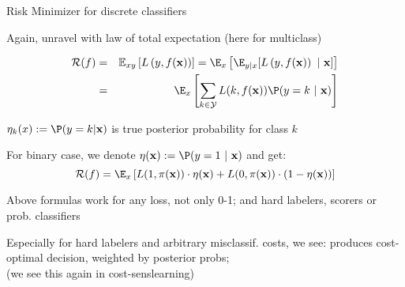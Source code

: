 \documentclass[11pt,compress,t,notes=noshow, xcolor=table]{beamer}
\begin{document}
\begin{framei}[sep=M]{Risk Minimizer for discrete classifiers}

\item Again, unravel with law of total expectation (here for multiclass)

\vspace*{-0.5cm}

\begin{eqnarray*}
  \riskf  & = & \Exy\left[\Lxy\right] = \E_x \left[ \E_{y|x} [ \Lxy ~|~ \xv ] \right] \\
          & = & \E_x \left[\sum_{k \in \Yspace} L(k, \fx) \P(y = k~|~ \xv)\right] 
\end{eqnarray*}

\item $\eta_k(x) := \P(y = k| \xv)$ is true posterior probability for class $k$

\item For binary case, we denote $\eta(\xv) := \P(y = 1 ~|~ \xv)$ and get: 
$$
\riskf = \E_x \left[L(1, \pix) \cdot \eta(\xv) + L(0, \pix) \cdot (1 - \eta(\xv)) \right]
$$

\item Above formulas work for any loss, not only 0-1; and hard labelers, scorers or prob. classifiers

\item Especially for hard labelers and arbitrary misclassif. costs, we see: produces cost-optimal decision, weighted by posterior probs; \\
(we see this again in cost-senslearning)




\end{framei}
\end{document}
